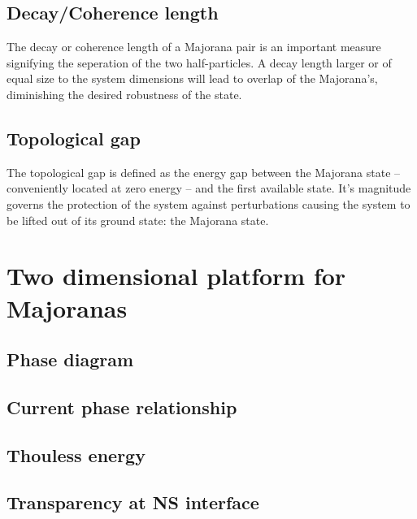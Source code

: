 	\subsection{Decay/Coherence length}
		The decay or coherence length of a Majorana pair is an important measure signifying the seperation of the two half-particles.
		A decay length larger or of equal size to the system dimensions will lead to overlap of the Majorana's, diminishing the desired robustness of the state.

	\subsection{Topological gap}
		The topological gap is defined as the energy gap between the Majorana state -- conveniently located at zero energy -- and the first available state.
		It's magnitude governs the protection of the system against perturbations causing the system to be lifted out of its ground state: the Majorana state.

\section{Two dimensional platform for Majoranas}
	
	\subsection{Phase diagram}

	\subsection{Current phase relationship}
	
	\subsection{Thouless energy}
	\subsection{Transparency at NS interface}
